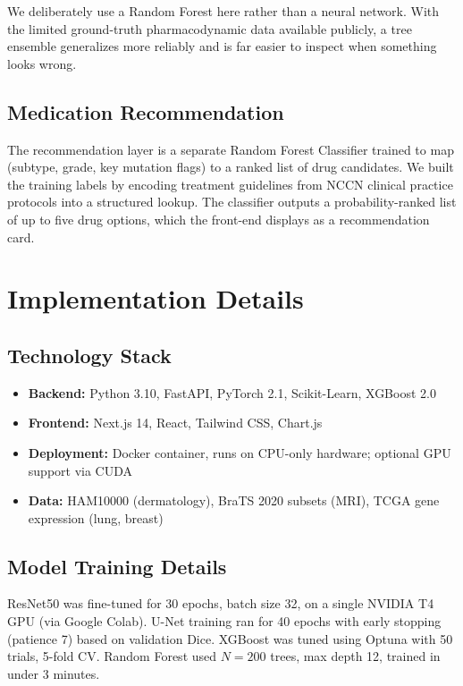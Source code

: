 \documentclass[conference]{IEEEtran}
\begin{document}
We deliberately use a Random Forest here rather than a neural network. With the limited ground-truth pharmacodynamic data available publicly, a tree ensemble generalizes more reliably and is far easier to inspect when something looks wrong.

\subsection{Medication Recommendation}

The recommendation layer is a separate Random Forest Classifier trained to map (subtype, grade, key mutation flags) to a ranked list of drug candidates. We built the training labels by encoding treatment guidelines from NCCN clinical practice protocols into a structured lookup. The classifier outputs a probability-ranked list of up to five drug options, which the front-end displays as a recommendation card.

\section{Implementation Details}

\subsection{Technology Stack}
\begin{itemize}
    \item \textbf{Backend:} Python 3.10, FastAPI, PyTorch 2.1, Scikit-Learn, XGBoost 2.0
    \item \textbf{Frontend:} Next.js 14, React, Tailwind CSS, Chart.js
    \item \textbf{Deployment:} Docker container, runs on CPU-only hardware; optional GPU support via CUDA
    \item \textbf{Data:} HAM10000 (dermatology), BraTS 2020 subsets (MRI), TCGA gene expression (lung, breast)
\end{itemize}

\subsection{Model Training Details}
ResNet50 was fine-tuned for 30 epochs, batch size 32, on a single NVIDIA T4 GPU (via Google Colab). U-Net training ran for 40 epochs with early stopping (patience 7) based on validation Dice. XGBoost was tuned using Optuna with 50 trials, 5-fold CV. Random Forest used $N=200$ trees, max depth 12, trained in under 3 minutes.
\end{document}
